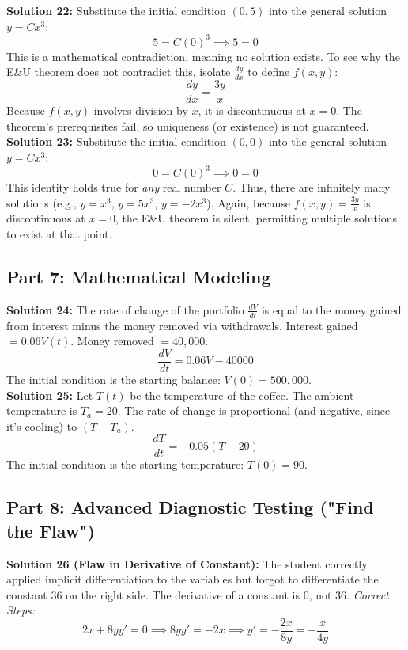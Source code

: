 \documentclass[12pt]{article}
\begin{document}
\noindent \textbf{Solution 22:} Substitute the initial condition $(0,5)$ into the general solution $y = C x^3$:
$$5 = C(0)^3 \implies 5 = 0$$
This is a mathematical contradiction, meaning no solution exists. To see why the E\&U theorem does not contradict this, isolate $\frac{dy}{dx}$ to define $f(x,y)$:
$$\frac{dy}{dx} = \frac{3y}{x}$$
Because $f(x,y)$ involves division by $x$, it is discontinuous at $x=0$. The theorem’s prerequisites fail, so uniqueness (or existence) is not guaranteed. \\

\noindent \textbf{Solution 23:} Substitute the initial condition $(0,0)$ into the general solution $y = C x^3$:
$$0 = C(0)^3 \implies 0 = 0$$
This identity holds true for \textit{any} real number $C$. Thus, there are infinitely many solutions (e.g., $y=x^3$, $y=5x^3$, $y=-2x^3$). Again, because $f(x,y) = \frac{3y}{x}$ is discontinuous at $x=0$, the E\&U theorem is silent, permitting multiple solutions to exist at that point.

\subsection*{Part 7: Mathematical Modeling}
\textbf{Solution 24:} The rate of change of the portfolio $\frac{dV}{dt}$ is equal to the money gained from interest minus the money removed via withdrawals.
Interest gained $= 0.06 V(t)$. Money removed $= 40,000$.
$$\frac{dV}{dt} = 0.06V - 40000$$
The initial condition is the starting balance: $V(0) = 500,000$. \\

\noindent \textbf{Solution 25:} Let $T(t)$ be the temperature of the coffee. The ambient temperature is $T_a = 20$. The rate of change is proportional (and negative, since it's cooling) to $(T - T_a)$.
$$\frac{dT}{dt} = -0.05(T - 20)$$
The initial condition is the starting temperature: $T(0) = 90$.

\subsection*{Part 8: Advanced Diagnostic Testing ("Find the Flaw")}
\textbf{Solution 26 (Flaw in Derivative of Constant):} The student correctly applied implicit differentiation to the variables but forgot to differentiate the constant $36$ on the right side. The derivative of a constant is 0, not 36.
\textit{Correct Steps:}
$$2x + 8y y' = 0 \implies 8y y' = -2x \implies y' = -\frac{2x}{8y} = -\frac{x}{4y}$$
\end{document}
